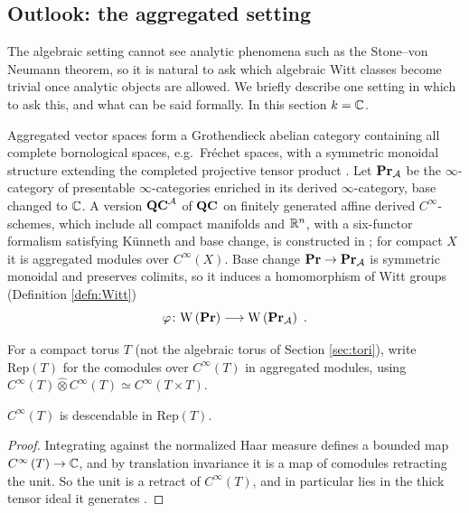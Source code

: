 \subsection{Outlook: the aggregated setting}
\label{sec:aggregated}

The algebraic setting cannot see analytic phenomena such as the Stone--von Neumann theorem, so it
is natural to ask which algebraic Witt classes become trivial once analytic objects are allowed. We
briefly describe one setting in which to ask this, and what can be said formally. In this section
$k=\mathbb{C}$.

Aggregated vector spaces form a Grothendieck abelian category containing all complete bornological
spaces, e.g.\ Fr\'echet spaces, with a symmetric monoidal structure extending the completed
projective tensor product \cite{Steff:six, Schneiders}. Let $\mathbf{Pr}_{\mathbf{\mathcal{A}}}$ be the $\infty$-category
of presentable $\infty$-categories enriched in its derived $\infty$-category, base changed to
$\mathbb{C}$. A version $\mathbf{QC}^{\mathbf{\mathcal{A}}}$ of $\mathbf{QC}$ on finitely generated affine derived $C^\infty$-schemes,
which include all compact manifolds and $\mathbb{R}^n$, with a six-functor formalism satisfying K\"unneth
and base change, is constructed in \cite{Steff:six}; for compact $X$ it is aggregated modules over
$C^\infty\left(X\right)$. Base change $\mathbf{Pr}\to\mathbf{Pr}_{\mathbf{\mathcal{A}}}$ is symmetric monoidal and preserves
colimits, so it induces a homomorphism of Witt groups (Definition \ref{defn:Witt})
\begin{equation}
\label{eqn:Witt_Agg}
\varphi\colon\mathrm{W}\left(\mathbf{Pr}\right)\longrightarrow\mathrm{W}\left(\mathbf{Pr}_{\mathbf{\mathcal{A}}}\right) \ .
\end{equation}

For a compact torus $T$ (not the algebraic torus of Section \ref{sec:tori}), write
$\mathrm{Rep}\left(T\right)$ for the comodules over
$C^\infty\left(T\right)$ in aggregated modules, using
$C^\infty\left(T\right)\hat\otimes C^\infty\left(T\right)\simeq C^\infty\left(T\times T\right)$.

\begin{lem}
\label{lem:averaging}
$C^\infty\left(T\right)$ is descendable in $\mathrm{Rep}\left(T\right)$.
\end{lem}

\begin{proof}
Integrating against the normalized Haar measure defines a bounded map $C^\infty\left(T\right)\to\mathbb{C}$,
and by translation invariance it is a map of comodules retracting the unit. So the unit is a retract
of $C^\infty\left(T\right)$, and in particular lies in the thick tensor ideal it generates
\cite{Mathew}.
\end{proof}

